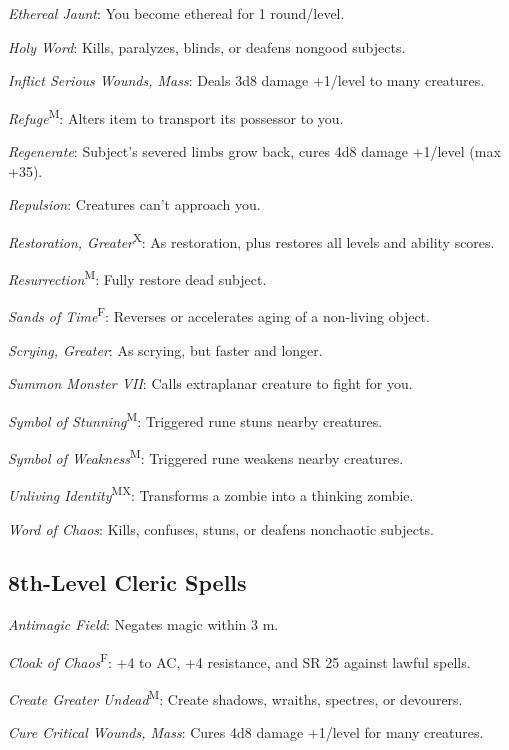 \textit{Ethereal Jaunt}: You become ethereal for 1 round/level.

\textit{Holy Word}: Kills, paralyzes, blinds, or deafens nongood subjects.

\textit{Inflict Serious Wounds, Mass}: Deals 3d8 damage +1/level to many creatures.

\textit{Refuge}\textsuperscript{M}: Alters item to transport its possessor to you.

\textit{Regenerate}: Subject's severed limbs grow back, cures 4d8 damage +1/level (max +35).

\textit{Repulsion}: Creatures can't approach you.

\textit{Restoration, Greater}\textsuperscript{X}: As restoration, plus restores all levels and ability scores.

\textit{Resurrection}\textsuperscript{M}: Fully restore dead subject.

\textit{Sands of Time}\textsuperscript{F}: Reverses or accelerates aging of a non-living object.

\textit{Scrying, Greater}: As scrying, but faster and longer.

\textit{Summon Monster VII}: Calls extraplanar creature to fight for you.

\textit{Symbol of Stunning}\textsuperscript{M}: Triggered rune stuns nearby creatures.

\textit{Symbol of Weakness}\textsuperscript{M}: Triggered rune weakens nearby creatures.

\textit{Unliving Identity}\textsuperscript{MX}: Transforms a zombie into a thinking zombie.

\textit{Word of Chaos}: Kills, confuses, stuns, or deafens nonchaotic subjects.



\subsection{8th-Level Cleric Spells}

\textit{Antimagic Field}: Negates magic within 3 m.

\textit{Cloak of Chaos}\textsuperscript{F}: +4 to AC, +4 resistance, and SR 25 against lawful spells.

\textit{Create Greater Undead}\textsuperscript{M}: Create shadows, wraiths, spectres, or devourers.

\textit{Cure Critical Wounds, Mass}: Cures 4d8 damage +1/level for many creatures.


